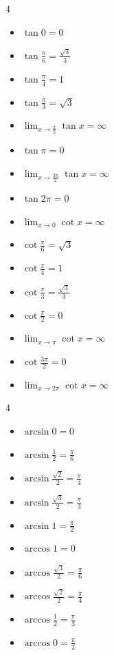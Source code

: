 \documentclass[lang=cn,math=mtpro2,10pt,scheme=chinese,black]{elegantbook}
\begin{document}
\vspace{1em}

\begin{multicols}{4}
\begin{itemize}
  \item \( \displaystyle \tan 0 = 0 \)
  \item \( \displaystyle \tan \frac{\pi}{6} = \frac{\sqrt{3}}{3} \)
  \item \( \displaystyle \tan \frac{\pi}{4} = 1 \)
  \item \( \displaystyle \tan \frac{\pi}{3} = \sqrt{3} \)
  \item \( \displaystyle \lim_{x \to \frac{\pi}{2}} \tan x = \infty \)
  \item \( \displaystyle \tan \pi = 0 \)
  \item \( \displaystyle \lim_{x \to \frac{3\pi}{2}} \tan x = \infty \)
  \item \( \displaystyle \tan 2\pi = 0 \)
  \item \( \displaystyle \lim_{x \to 0} \cot x = \infty \)
  \item \( \displaystyle \cot \frac{\pi}{6} = \sqrt{3} \)
  \item \( \displaystyle \cot \frac{\pi}{4} = 1 \)
  \item \( \displaystyle \cot \frac{\pi}{3} = \frac{\sqrt{3}}{3} \)
  \item \( \displaystyle \cot \frac{\pi}{2} = 0 \)
  \item \( \displaystyle \lim_{x \to \pi} \cot x = \infty \)
  \item \( \displaystyle \cot \frac{3\pi}{2} = 0 \)
  \item \( \displaystyle \lim_{x \to 2\pi} \cot x = \infty \)
\end{itemize}
\end{multicols}

\vspace{1em}

\begin{multicols}{4}
\begin{itemize}
  \item \( \displaystyle \arcsin 0 = 0 \)
  \item \( \displaystyle \arcsin \frac{1}{2} = \frac{\pi}{6} \)
  \item \( \displaystyle \arcsin \frac{\sqrt{2}}{2} = \frac{\pi}{4} \)
  \item \( \displaystyle \arcsin \frac{\sqrt{3}}{2} = \frac{\pi}{3} \)
  \item \( \displaystyle \arcsin 1 = \frac{\pi}{2} \)
  \item \( \displaystyle \arccos 1 = 0 \)
  \item \( \displaystyle \arccos \frac{\sqrt{3}}{2} = \frac{\pi}{6} \)
  \item \( \displaystyle \arccos \frac{\sqrt{2}}{2} = \frac{\pi}{4} \)
  \item \( \displaystyle \arccos \frac{1}{2} = \frac{\pi}{3} \)
  \item \( \displaystyle \arccos 0 = \frac{\pi}{2} \)
\end{itemize}
\end{multicols}
\end{document}
